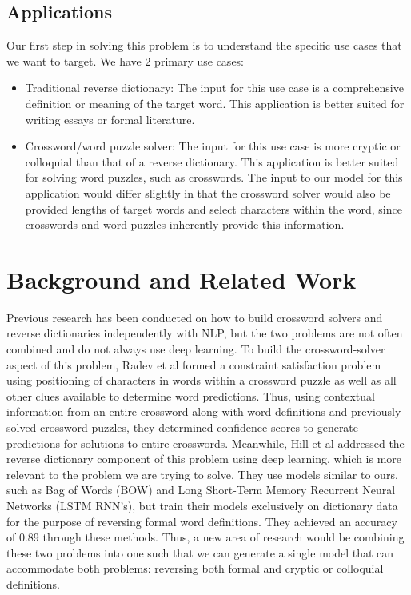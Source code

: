 \documentclass{article} %
\begin{document}
\subsection{Applications}
Our first step in solving this problem is to understand the specific use cases that we want to target. We have 2 primary use cases: 
\begin{itemize}
\item Traditional reverse dictionary: The input for this use case is a comprehensive definition or meaning of the target word. This application is better suited for writing essays or formal literature. 
\item Crossword/word puzzle solver: The input for this use case is more cryptic or colloquial than that of a reverse dictionary. This application is better suited for solving word puzzles, such as crosswords. The input to our model for this application would differ slightly in that the crossword solver would also be provided lengths of target words and select characters within the word, since crosswords and word puzzles inherently provide this information. 
\end{itemize}

\section{Background and Related Work}
Previous research has been conducted on how to build crossword solvers and reverse dictionaries independently with NLP, but the two problems are not often combined and do not always use deep learning.
To build the crossword-solver aspect of this problem, Radev et al formed a constraint satisfaction problem using positioning of characters in words within a crossword puzzle as well as all other clues available to determine word predictions. Thus, using contextual information from an entire crossword along with word definitions and previously solved crossword puzzles, they determined confidence scores to generate predictions for solutions to entire crosswords.
Meanwhile, Hill et al addressed the reverse dictionary component of this problem using deep learning, which is more relevant to the problem we are trying to solve. They use models similar to ours, such as Bag of Words (BOW) and Long Short-Term Memory Recurrent Neural Networks (LSTM RNN’s), but train their models exclusively on dictionary data for the purpose of reversing formal word definitions. They achieved an accuracy of 0.89 through these methods. 
Thus, a new area of research would be combining these two problems into one such that we can generate a single model that can accommodate both problems: reversing both formal and cryptic or colloquial definitions.
\end{document}
